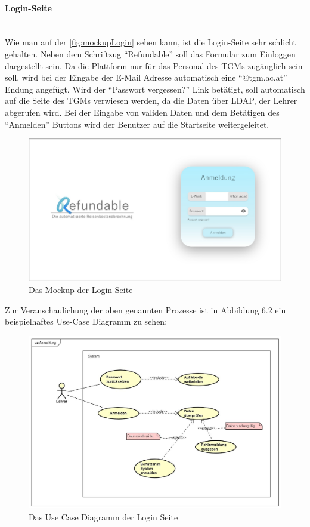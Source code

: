 \paragraph{Login-Seite}
~\\
Wie man auf der \autoref{fig:mockupLogin} sehen kann, ist die Login-Seite sehr schlicht gehalten. Neben dem Schriftzug \enquote{Refundable} soll das Formular zum Einloggen dargestellt sein. Da die Plattform nur für das Personal des TGMs zugänglich sein soll, wird bei der Eingabe der E-Mail Adresse automatisch eine \enquote{@tgm.ac.at} Endung angefügt. Wird der \enquote{Passwort vergessen?} Link betätigt, soll automatisch auf die Seite des TGMs verwiesen werden, da die Daten über LDAP, der Lehrer abgerufen wird. Bei der Eingabe von validen Daten und dem Betätigen des \enquote{Anmelden} Buttons wird der Benutzer auf die Startseite weitergeleitet.
\begin{figure}[H]
	\centering
	\includegraphics[width=1\linewidth]{images/Mockup-Startseite}
	\caption[Mockup Login]{Das Mockup der Login Seite}
	\label{fig:mockupLogin}
\end{figure}
Zur Veranschaulichung der oben genannten Prozesse ist in Abbildung 6.2 ein beispielhaftes Use-Case Diagramm zu sehen: 
\begin{figure}[H]
	\centering
	\includegraphics[width=1\linewidth]{images/uc-login}
	\caption[Use Case Diagramm Login]{Das Use Case Diagramm der Login Seite}
	\label{fig:ucLogin}
\end{figure}
\newpage
